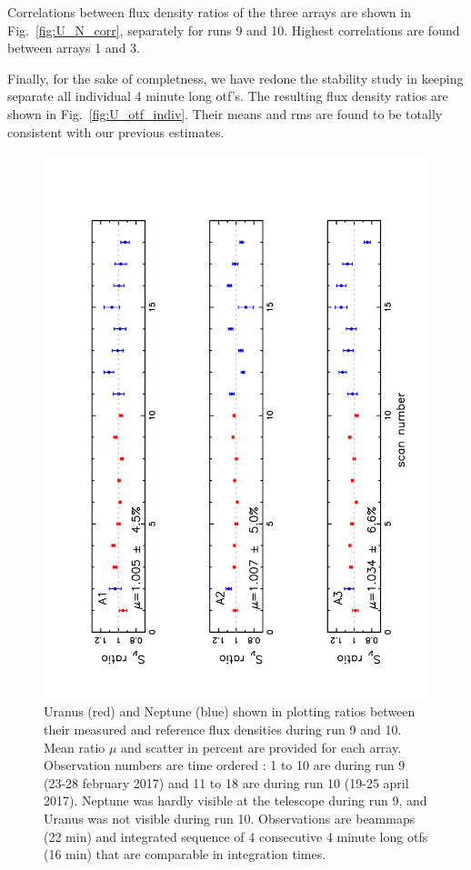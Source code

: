 Correlations between flux density ratios of the three arrays are shown in Fig.~\ref{fig:U_N_corr}, separately
for runs 9 and  10. Highest correlations are found between arrays 1 and 3.

Finally, for the sake of completness, we have redone the stability study
in keeping separate all individual 4 minute long otf's.
The resulting flux density ratios are shown in Fig.~\ref{fig:U_otf_indiv}.
Their means and rms are found to be totally consistent with our previous estimates.


\begin{figure}[p]
\begin{center}
  \includegraphics[clip, angle=-90, scale=0.6]{Figures/Ura_Nept_r9_10.pdf}
  \caption[Stability of calibration with the primary calibrators]{
    Uranus (red) and Neptune (blue)  shown in plotting
    ratios between their measured and reference flux densities during run 9 and 10.
    Mean ratio $\mu$ and scatter in percent are provided for each array.
    Observation numbers are time ordered : 1 to 10 are during run 9 (23-28 february 2017) and 11 to 18 are during run 10 (19-25 april 2017).
    Neptune was hardly visible at the telescope during run 9, and Uranus was not visible during run 10.
    Observations are beammaps (22 min) and integrated sequence of 4 consecutive 4 minute long otfs (16 min) that are
    comparable in integration times.}
\label{fig:U_N_ratio}
\end{center}
\end{figure}

